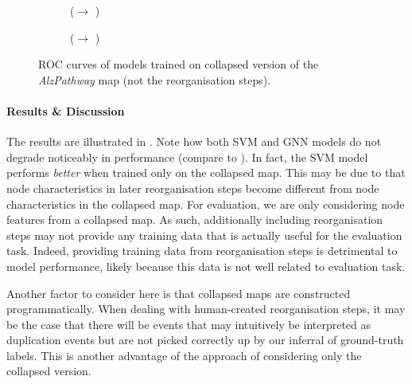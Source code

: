 \documentclass[
	fontsize=10pt, %
	twoside=false, %
	secnumdepth=1, %
  toc=indentunnumbered %
]{kaobook}
\begin{document}
\begin{figure}[h]
  \centering
  \begin{subfigure}[h]{0.48\linewidth}
    \caption{(\ADLast $\rightarrow$ \PDMap)}
  \end{subfigure}
  \begin{subfigure}[h]{0.48\linewidth}
    \caption{(\ADLast $\rightarrow$ \ReconMap{})}
  \end{subfigure}
  \caption{ROC curves of models trained on collapsed version of the
    \textit{AlzPathway} map (not the reorganisation steps).}
  \label{fig:importance-reorganisation-steps}
\end{figure}

\paragraph{Results \& Discussion} The results are illustrated in
. Note how both SVM and GNN models do
not degrade noticeably in performance (compare to ).
In fact, the SVM model performs \textit{better} when trained only on the
collapsed map.
%
This may be due to that node characteristics in later reorganisation steps become
different from node characteristics in the collapsed map. For evaluation, we are
only considering node features from a collapsed map. As such, additionally
including reorganisation steps may not provide any training data that is
actually useful for the evaluation task. Indeed, providing training data from
reorganisation steps is detrimental to model performance, likely because this
data is not well related to evaluation task. 



Another factor to consider here is that collapsed maps are constructed
programmatically. When dealing with human-created reorganisation steps, it may
be the case that there will be events that may intuitively be interpreted as
duplication events but are not picked correctly up by our inferral of
ground-truth labels. This is another advantage of the approach of considering
only the collapsed version.
\end{document}
